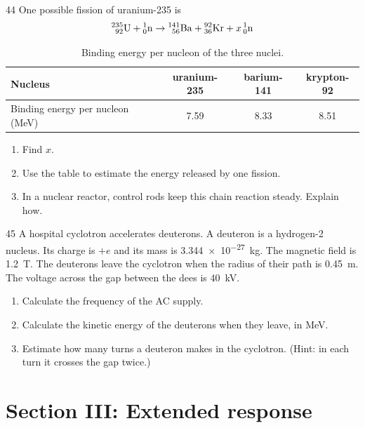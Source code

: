 \begin{practiceq}{4}{4}\label{pq:fission}
One possible fission of uranium-235 is
\[
  \pracNuc{235}{92}{U} + \pracNuc{1}{0}{n} \to \pracNuc{141}{56}{Ba} + \pracNuc{92}{36}{Kr}
  + x\,\pracNuc{1}{0}{n}
\]
\begin{table}
  \caption*{Binding energy per nucleon of the three nuclei.}
  \centering
  \begin{tabular}{@{}lccc@{}}
    \toprule
    Nucleus & uranium-235 & barium-141 & krypton-92\\
    \midrule
    Binding energy per nucleon (\si{MeV}) & 7.59 & 8.33 & 8.51\\
    \bottomrule
  \end{tabular}
\end{table}
\begin{enumerate}[label=(\alph*)]
  \item Find $x$. 
  \item Use the table to estimate the energy released by one fission. 
  \item In a nuclear reactor, control rods keep this chain reaction steady. Explain how.
\end{enumerate}
\end{practiceq}

\begin{practiceq}{4}{5}\label{pq:cyclotron}
A hospital cyclotron accelerates deuterons. A deuteron is a hydrogen-2 nucleus. Its charge is
$+e$ and its mass is \qty{3.344e-27}{kg}. The magnetic field is \qty{1.2}{T}. The deuterons
leave the cyclotron when the radius of their path is \qty{0.45}{m}. The voltage across the
gap between the dees is \qty{40}{kV}.
\begin{enumerate}[label=(\alph*)]
  \item Calculate the frequency of the AC supply. 
  \item Calculate the kinetic energy of the deuterons when they leave, in MeV.
  \item Estimate how many turns a deuteron makes in the cyclotron. (Hint: in each turn it
        crosses the gap twice.) 
\end{enumerate}
\end{practiceq}

\section*{Section III: Extended response}

